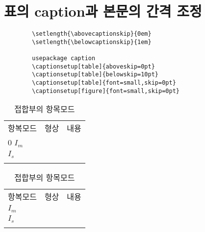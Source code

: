 \documentclass[12pt,a4paper]{report}
\begin{document}
		
		



%
%
%	
	\clearpage
	\section{표의 caption과 본문의 간격 조정}

		\begin{verbatim}
		\setlength{\abovecaptionskip}{0em}
		\setlength{\belowcaptionskip}{1em}

		usepackage caption 
		\captionsetup[table]{aboveskip=0pt}
		\captionsetup[table]{belowskip=10pt}
		\captionsetup[table]{font=small,skip=0pt}
		\captionsetup[figure]{font=small,skip=0pt}
		\end{verbatim}


		\begin{table}[h]
		\setlength{\abovecaptionskip}{0em}
		\setlength{\belowcaptionskip}{1em}

		\caption{접합부의 항목모드}
		\begin{tabu} to 1.0\textwidth { X[r,m, 1.0] X[c, 1.0] X[3.0] }
		\tabucline[0.2ex]{-}		
		항복모드	&형상		&내용\\
		\tabucline[0.2ex]{-}		0
		$I_m$		&\\
		\tabucline[0.01ex]{-}		
		$I_s$			&\\
		\tabucline[0.1ex]{-}		
		\end{tabu}
		\end{table}

		\begin{table}[h]
		\caption{접합부의 항목모드}
		\begin{tabu} to 1.0\textwidth { X[r,m, 1.0] X[c, 1.0] X[3.0] }
		\tabucline[0.2ex]{-}		
		항복모드	&형상		&내용\\
		\tabucline[0.2ex]{-}		
		$I_m$		&\\
		\tabucline[0.01ex]{-}		
		$I_s$			&\\
		\tabucline[0.1ex]{-}		
		\end{tabu}
		\end{table}



%
%
%	
	\clearpage
\end{document}
